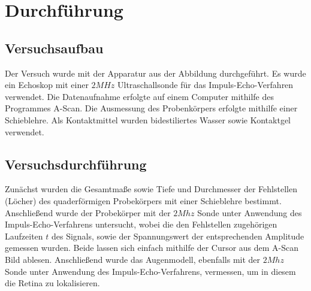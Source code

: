 \section{Durchführung}
\label{sec:durchfuehrung}
\subsection{Versuchsaufbau}
Der Versuch wurde mit der Apparatur aus der Abbildung durchgeführt. Es wurde ein Echoskop mit einer $2MHz$ Ultraschallsonde für das Impuls-Echo-Verfahren verwendet.
Die Datenaufnahme erfolgte auf einem Computer mithilfe des Programmes A-Scan. Die Ausmessung des Probenkörpers erfolgte mithilfe einer Schieblehre. Als Kontaktmittel wurden bidestiliertes Wasser sowie Kontaktgel verwendet.
\subsection{Versuchsdurchführung}
Zunächst wurden die Gesamtmaße sowie Tiefe und Durchmesser der Fehlstellen (Löcher) des quaderförmigen Probekörpers mit einer Schieblehre bestimmt.
Anschließend wurde der Probekörper mit der $2Mhz$ Sonde unter Anwendung des Impuls-Echo-Verfahrens untersucht, wobei die den Fehlstellen zugehörigen Laufzeiten $t$ des Signals, sowie der Spannungswert der entsprechenden Amplitude gemessen wurden. Beide lassen sich einfach mithilfe der Cursor aus dem A-Scan Bild ablesen.
Anschließend wurde das Augenmodell, ebenfalls mit der $2Mhz$ Sonde unter Anwendung des Impuls-Echo-Verfahrens, vermessen, um in diesem die Retina zu lokalisieren.
